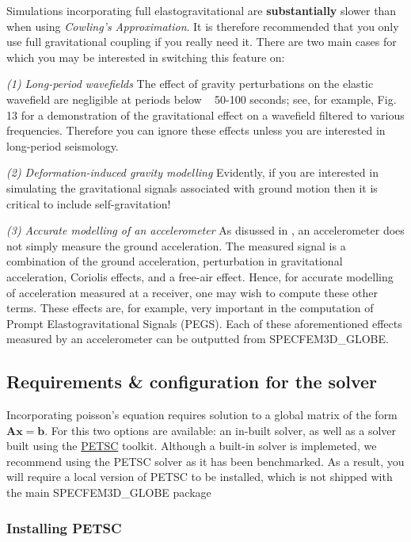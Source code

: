 Simulations incorporating full elastogravitational are \textbf{substantially} slower than when using \textit{Cowling's Approximation}. 
It is therefore recommended that you only use full gravitational coupling if you really need it. There are two main cases
for which you may be interested in switching this feature on: 

\textit{(1) Long-period wavefields}
The effect of gravity perturbations on the elastic wavefield are negligible at periods below ~ 50-100 seconds; see, for 
example, \cite{GhEaTr23} Fig. 13 for a demonstration of the gravitational effect on a wavefield filtered to various 
frequencies. Therefore you can ignore these effects unless you are interested in long-period seismology.

\textit{(2) Deformation-induced gravity modelling}
Evidently, if you are interested in simulating the gravitational signals associated with ground motion then it is critical
to include self-gravitation! 

\textit{(3) Accurate modelling of an accelerometer} 
As disussed in \cite[][Ch. 4]{DaTr98}, an accelerometer does not simply measure the ground acceleration. The measured signal 
is a combination of the ground acceleration, perturbation in gravitational acceleration, Coriolis effects, and a free-air effect. 
Hence, for accurate modelling of acceleration measured at a receiver, one may wish to compute these other terms. These 
effects are, for example, very important in the computation of Prompt Elastogravitational Signals (PEGS). Each of these
aforementioned effects measured by an accelerometer can be outputted from SPECFEM3D_GLOBE. 


\subsection{Requirements & configuration for the solver}

Incorporating poisson's equation requires solution to a global matrix of the form $\mathbf{A}\mathbf{x} = \mathbf{b}$. 
For this two options are available: an in-built solver, as well as a solver built using the \href{http://petsc.org/release/}{PETSC} toolkit. 
Although a built-in solver is implemeted, we recommend using the PETSC solver as it has been benchmarked. As a result, 
you will require a local version of PETSC to be installed, which is not shipped with the main SPECFEM3D_GLOBE package 

\subsubsection{Installing PETSC}

